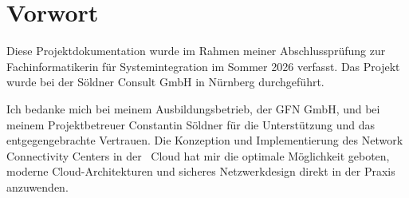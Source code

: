 \chapter*{Vorwort}

Diese Projektdokumentation wurde im Rahmen meiner Abschlussprüfung zur Fachinformatikerin für Systemintegration im Sommer 2026 verfasst. Das Projekt wurde bei der Söldner Consult GmbH in Nürnberg durchgeführt. 

Ich bedanke mich bei meinem Ausbildungsbetrieb, der GFN GmbH, und bei meinem Projektbetreuer Constantin Söldner für die Unterstützung und das entgegengebrachte Vertrauen. Die Konzeption und Implementierung des Network Connectivity Centers in der \googlelogo\ Cloud hat mir die optimale Möglichkeit geboten, moderne Cloud-Architekturen und sicheres Netzwerkdesign direkt in der Praxis anzuwenden.